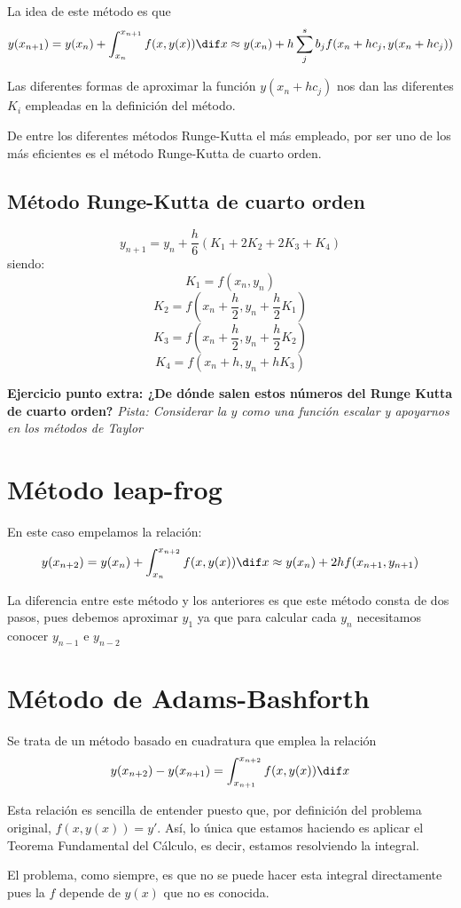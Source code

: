 La idea de este método es que
\[y(x_{n+1}) = y(x_n) + \int_{x_n}^{x_{n+1}} f(x,y(x))\dif x \approx y(x_n)+h \sum_{j}^{s} b_j f(x_n+hc_j, y(x_n+hc_j))\]

Las diferentes formas de aproximar la función $y(x_n+hc_j)$ nos dan las diferentes $K_i$ empleadas en la definición del método.

De entre los diferentes métodos Runge-Kutta el más empleado, por ser uno de los más eficientes es el método Runge-Kutta de cuarto orden.

\subsection{Método Runge-Kutta de cuarto orden}
\[y_{n+1} = y_n +\frac{h}{6}(K_1+2K_2+2K_3+K_4)\]
siendo:
\[K_1 = f(x_n,y_n)\]
\[K_2 = f(x_n+\frac{h}{2}, y_n+\frac{h}{2}K_1)\]
\[K_3 = f(x_n+\frac{h}{2}, y_n + \frac{h}{2}K_2)\]
\[K_4 = f(x_n+h, y_n + h K_3)\]

\textbf{Ejercicio punto extra: ¿De dónde salen estos números del Runge Kutta de cuarto orden?}
\textit{Pista: Considerar la $y$ como una función escalar y apoyarnos en los métodos de Taylor}

\section{Método leap-frog}
En este caso empelamos la relación:
\[y(x_{n+2}) = y(x_n) + \int_{x_n}^{x_{n+2}} f(x,y(x)) \dif x \approx y(x_n) + 2h f(x_{n+1},y_{n+1})\]

La diferencia entre este método y los anteriores es que este método consta de dos pasos, pues debemos aproximar $y_1$ ya que para calcular cada $y_n$ necesitamos conocer $y_{n-1}$ e $y_{n-2}$

\section{Método de Adams-Bashforth}

Se trata de un método basado en cuadratura que emplea la relación
\[y(x_{n+2}) - y(x_{n+1}) = \int_{x_{n+1}}^{x_{n+2}} f(x,y(x)) \dif x\]

\begin{remark}
Esta relación es sencilla de entender puesto que, por definición del problema original, $f(x,y(x))=y'$. Así, lo única que estamos haciendo es aplicar el Teorema Fundamental del Cálculo, es decir, estamos resolviendo la integral.

El problema, como siempre, es que no se puede hacer esta integral directamente pues la $f$ depende de $y(x)$ que no es conocida.
\end{remark}

